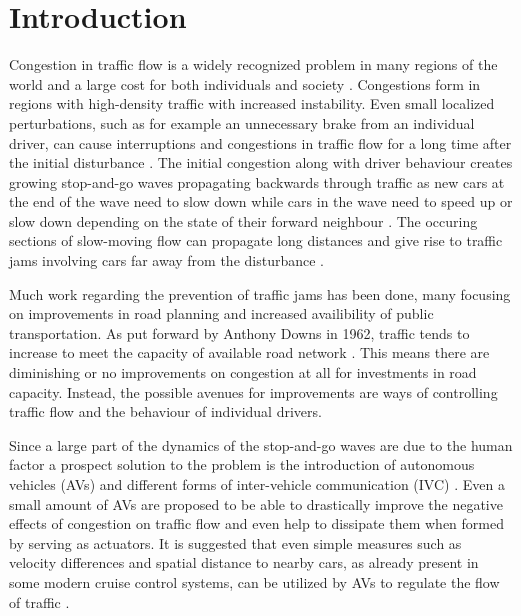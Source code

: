 \documentclass[11pt,a4paper,twocolumn]{article}
\begin{document}
\section{Introduction}
Congestion in traffic flow is a widely recognized problem in many regions of the world and a large cost for both individuals and society \cite{inrix}. Congestions form in regions with high-density traffic with increased instability. Even small localized perturbations, such as for example an unnecessary brake from an individual driver, can cause interruptions and congestions in traffic flow for a long time after the initial disturbance \cite{kerner97flow, bando1995dynamical}. The initial congestion along with driver behaviour creates growing stop-and-go waves propagating backwards through traffic as new cars at the end of the wave need to slow down while cars in the wave need to speed up or slow down depending on the state of their forward neighbour  \cite{stern17autonomous, kerner96trafficjam}. The occuring sections of slow-moving flow can propagate long distances and give rise to traffic jams involving cars far away from the disturbance \cite{kerner96trafficjam}.

Much work regarding the prevention of traffic jams has been done, many focusing on improvements in road planning and increased availibility of public transportation. As put forward by Anthony Downs in 1962, traffic tends to increase to meet the capacity of available road network \cite{downs2000stuck, downs2005still, downs1962law}. This means there are diminishing or no improvements on congestion at all for investments in road capacity. Instead, the possible avenues for improvements are ways of controlling traffic flow and the behaviour of individual drivers.

Since a large part of the dynamics of the stop-and-go waves are due to the human factor a prospect solution to the problem is the introduction of autonomous vehicles (AVs) and different forms of inter-vehicle communication (IVC) \cite{stern17autonomous, darbha1999cruisecontrol, bauza2013vehicle2vehicle, fagnant2015autonomous}. Even a small amount of AVs are proposed to be able to drastically improve the negative effects of congestion on traffic flow and even help to dissipate them when formed by serving as actuators. It is suggested that even simple measures such as velocity differences and spatial distance to nearby cars, as already present in some modern cruise control systems, can be utilized by AVs to regulate the flow of traffic \cite{stern17autonomous}.
\end{document}
